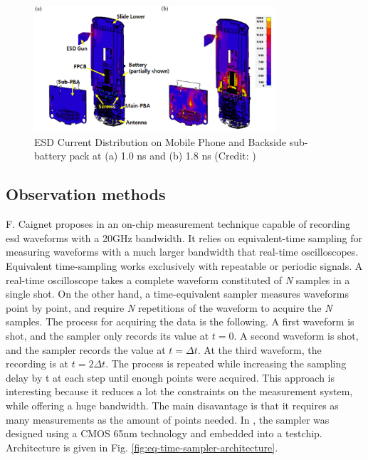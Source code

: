 \begin{figure}[!h]
  \centering
  \includegraphics[width=0.8\textwidth]{src/1/figures/current_distribution_mobile.png}
  \caption{ESD Current Distribution on Mobile Phone and Backside sub-battery pack at (a) 1.0 ns and (b) 1.8 ns (Credit: \cite{softFailMobile})}
  \label{fig:mobile-phone-3d-em}
\end{figure}

\subsection{Observation methods}

F. Caignet proposes in \cite{eq-time-sampling} an on-chip measurement technique capable of recording \gls{esd} waveforms with a 20GHz bandwidth.
It relies on equivalent-time sampling for measuring waveforms with a much larger bandwidth that real-time oscilloscopes.
Equivalent time-sampling works exclusively with repeatable or periodic signals.
A real-time oscilloscope takes a complete waveform constituted of \textit{N} samples in a single shot.
On the other hand, a time-equivalent sampler measures waveforms point by point, and require \textit{N} repetitions of the waveform to acquire the \textit{N} samples.
The process for acquiring the data is the following.
A first waveform is shot, and the sampler only records its value at $t=0$.
A second waveform is shot, and the sampler records the value at $t=\Delta t$.
At the third waveform, the recording is at $t=2\Delta t$.
The process is repeated while increasing the sampling delay by \textDelta{}t at each step until enough points were acquired.
This approach is interesting because it reduces a lot the constraints on the measurement system, while offering a huge bandwidth.
The main disavantage is that it requires as many measurements as the amount of points needed.
In \cite{eq-time-sampling}, the sampler was designed using a CMOS 65nm technology and embedded into a testchip.
Architecture is given in Fig. \ref{fig:eq-time-sampler-architecture}.

